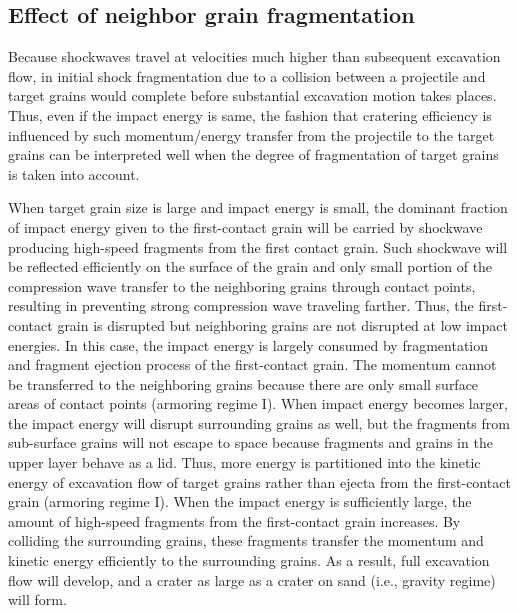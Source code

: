 \documentclass[3p,authoryear]{elsarticle}
\begin{document}
\subsection{Effect of neighbor grain fragmentation}\label{sec:mechanism}
Because shockwaves travel at velocities much higher than subsequent excavation flow, in initial shock fragmentation due to a collision between a projectile and target grains would complete before substantial excavation motion takes places.
Thus, even if the impact energy is same, the fashion that cratering efficiency is influenced by such momentum/energy transfer from the projectile to the target grains can be interpreted well when the degree of fragmentation of target grains is taken into account.

When target grain size is large and impact energy is small, the dominant fraction of impact energy given to the first-contact grain will be carried by shockwave producing high-speed fragments from the first contact grain.
Such shockwave will be reflected efficiently on the surface of the grain and only small portion of the compression wave transfer to the neighboring grains through contact points, resulting in preventing strong compression wave traveling farther.
Thus, the first-contact grain is disrupted but neighboring grains are not disrupted at low impact energies. In this case, the impact energy is largely consumed by fragmentation and fragment ejection process of the first-contact grain.
The momentum cannot be transferred to the neighboring grains because there are only small surface areas of contact points (armoring regime I).
When impact energy becomes larger, the impact energy will disrupt surrounding grains as well, but the fragments from sub-surface grains will not escape to space because fragments and grains in the upper layer behave as a lid.
Thus, more energy is partitioned into the kinetic energy of excavation flow of target grains rather than ejecta from the first-contact grain (armoring regime I).
When the impact energy is sufficiently large, the amount of high-speed fragments from the first-contact grain increases.
By colliding the surrounding grains, these fragments transfer the momentum and kinetic energy efficiently to the surrounding grains.
As a result, full excavation flow will develop, and a crater as large as a crater on sand (i.e., gravity regime) will form.
\end{document}
